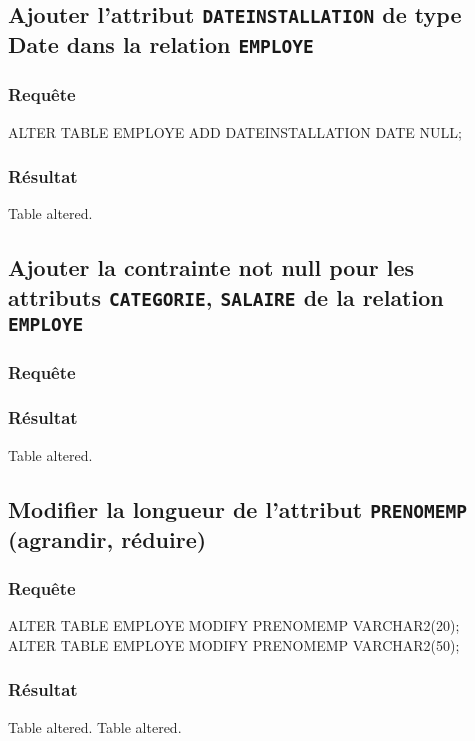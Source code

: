 \documentclass[•]{article}
\begin{document}
\subsection{Ajouter l’attribut \texttt{DATEINSTALLATION} de type Date dans la relation \texttt{EMPLOYE}}
\subsubsection{Requête}
\begin{sql}
ALTER TABLE EMPLOYE ADD DATEINSTALLATION DATE NULL;
\end{sql}
\subsubsection{Résultat}
\begin{sql}
Table altered.
\end{sql}
\subsection{Ajouter la contrainte not null pour les attributs \texttt{CATEGORIE}, \texttt{SALAIRE} de la relation \texttt{EMPLOYE}}
\subsubsection{Requête}

\subsubsection{Résultat}
\begin{sql}
Table altered.
\end{sql}
\subsection{Modifier la longueur de l’attribut \texttt{PRENOMEMP} (agrandir, réduire)}
\subsubsection{Requête}
\begin{sql}
ALTER TABLE EMPLOYE MODIFY PRENOMEMP VARCHAR2(20);
ALTER TABLE EMPLOYE MODIFY PRENOMEMP VARCHAR2(50);
\end{sql}
\subsubsection{Résultat}
\begin{sql}
Table altered.
Table altered.
\end{sql}
\end{document}
